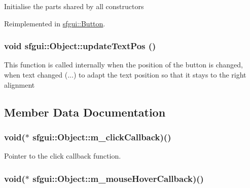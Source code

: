 Initialise the parts shared by all constructors 

Reimplemented in \hyperlink{classsfgui_1_1Button_59849e58ed4c46061d71f7172cab4e4e}{sfgui::Button}.\hypertarget{classsfgui_1_1Object_27d9eb8b653f263f76b612cd77512321}{
\subsubsection[updateTextPos]{\setlength{\rightskip}{0pt plus 5cm}void sfgui::Object::updateTextPos ()}}
\label{classsfgui_1_1Object_27d9eb8b653f263f76b612cd77512321}




This function is called internally when the position of the button is changed, when text changed (...) to adapt the text position so that it stays to the right alignment 

\subsection{Member Data Documentation}
\hypertarget{classsfgui_1_1Object_5917de9750aa3c8d282899ee83f835b4}{
\subsubsection[m\_\-clickCallback]{\setlength{\rightskip}{0pt plus 5cm}void($\ast$ {\bf sfgui::Object::m\_\-clickCallback})()}}
\label{classsfgui_1_1Object_5917de9750aa3c8d282899ee83f835b4}


Pointer to the click callback function. 

\hypertarget{classsfgui_1_1Object_ddff61a2d47a7b25e05aa5b6311417ea}{
\subsubsection[m\_\-mouseHoverCallback]{\setlength{\rightskip}{0pt plus 5cm}void($\ast$ {\bf sfgui::Object::m\_\-mouseHoverCallback})()}}
\label{classsfgui_1_1Object_ddff61a2d47a7b25e05aa5b6311417ea}


